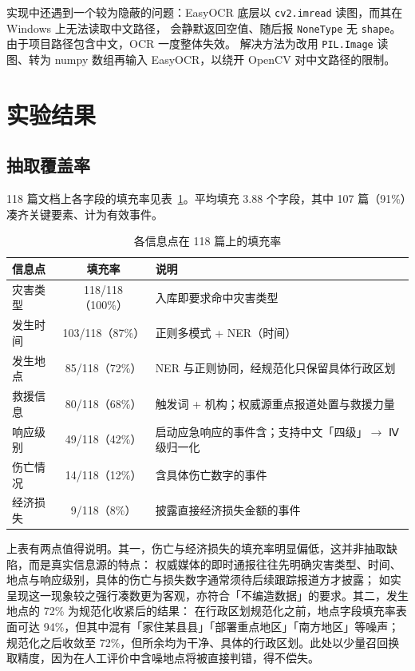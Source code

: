 \documentclass[11pt,a4paper]{ctexart}
\begin{document}
实现中还遇到一个较为隐蔽的问题：EasyOCR 底层以 \texttt{cv2.imread} 读图，而其在 Windows 上无法读取中文路径，
会静默返回空值、随后报 \texttt{NoneType} 无 \texttt{shape}。由于项目路径包含中文，OCR 一度整体失效。
解决方法为改用 \texttt{PIL.Image} 读图、转为 numpy 数组再输入 EasyOCR，以绕开 OpenCV 对中文路径的限制。

\section{实验结果}

\subsection{抽取覆盖率}

118 篇文档上各字段的填充率见表~\ref{tab:cover}。平均填充 3.88 个字段，其中 107 篇（91\%）凑齐关键要素、计为有效事件。

\begin{table}[ht]
\centering
\caption{各信息点在 118 篇上的填充率}
\label{tab:cover}
\begin{tabular}{lcl}
\toprule
信息点 & 填充率 & 说明 \\
\midrule
灾害类型 & 118/118（100\%） & 入库即要求命中灾害类型 \\
发生时间 & 103/118（87\%） & 正则多模式 + NER（时间） \\
发生地点 & 85/118（72\%） & NER 与正则协同，经规范化只保留具体行政区划 \\
救援信息 & 80/118（68\%） & 触发词 + 机构；权威源重点报道处置与救援力量 \\
响应级别 & 49/118（42\%） & 启动应急响应的事件含；支持中文「四级」$\to$ Ⅳ级归一化 \\
伤亡情况 & 14/118（12\%） & 含具体伤亡数字的事件 \\
经济损失 & 9/118（8\%） & 披露直接经济损失金额的事件 \\
\bottomrule
\end{tabular}
\end{table}

上表有两点值得说明。其一，伤亡与经济损失的填充率明显偏低，这并非抽取缺陷，而是真实信息源的特点：
权威媒体的即时通报往往先明确灾害类型、时间、地点与响应级别，具体的伤亡与损失数字通常须待后续跟踪报道方才披露；
如实呈现这一现象较之强行凑数更为客观，亦符合「不编造数据」的要求。其二，发生地点的 72\% 为规范化收紧后的结果：
在行政区划规范化之前，地点字段填充率表面可达 94\%，但其中混有「家住某县县」「部署重点地区」「南方地区」等噪声；
规范化之后收敛至 72\%，但所余均为干净、具体的行政区划。此处以少量召回换取精度，因为在人工评价中含噪地点将被直接判错，得不偿失。
\end{document}
